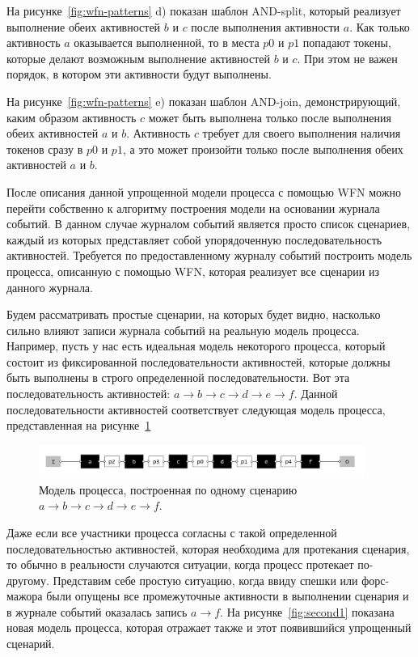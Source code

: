 \documentclass[
11pt,%
tightenlines,%
twoside,%
onecolumn,%
nofloats,%
nobibnotes,%
nofootinbib,%
superscriptaddress,%
noshowpacs,%
centertags]%
{revtex4}
\begin{document}
На рисунке~\ref{fig:wfn-patterns} d) показан шаблон AND-split, который реализует выполнение обеих активностей $b$ и $c$ после выполнения активности $a$.
Как только активность $a$ оказывается выполненной, то в места $p0$ и $p1$ попадают токены, которые делают возможным выполнение активностей $b$ и $c$.
При этом не важен порядок, в котором эти активности будут выполнены.

На рисунке~\ref{fig:wfn-patterns} e) показан шаблон AND-join, демонстрирующий, каким образом активность $c$ может быть выполнена только после выполнения обеих активностей $a$ и $b$.
Активность $c$ требует для своего выполнения наличия токенов сразу в $p0$ и $p1$, а это может произойти только после выполнения обеих активностей $a$ и $b$.

После описания данной упрощенной модели процесса с помощью WFN можно перейти собственно к алгоритму построения модели на основании журнала событий.
В данном случае журналом событий является просто список сценариев, каждый из которых представляет собой упорядоченную последовательность активностей.
Требуется по предоставленному журналу событий построить модель процесса, описанную с помощью WFN, которая реализует все сценарии из данного журнала.

Будем рассматривать простые сценарии, на которых будет видно, насколько сильно влияют записи журнала событий на реальную модель процесса.
Например, пусть у нас есть идеальная модель некоторого процесса, который состоит из фиксированной последовательности активностей, которые должны быть выполнены в строго определенной последовательности.
Вот эта последовательность активностей: $a \rightarrow b \rightarrow c \rightarrow d \rightarrow e \rightarrow f$.
Данной последовательности активностей соответствует следующая модель процесса, представленная на рисунке~\ref{fig:origin1}

\begin{figure}[h]
\setcaptionmargin{5mm}
\includegraphics[width=0.95\textwidth]{pics/origin1.png}
\caption{Модель процесса, построенная по одному сценарию $a \rightarrow b \rightarrow c \rightarrow d \rightarrow e \rightarrow f$.}
\label{fig:origin1}
\end{figure}

Даже если все участники процесса согласны с такой определенной последовательностью активностей, которая необходима для протекания сценария, то обычно в реальности случаются ситуации, когда процесс протекает по-другому.
Представим себе простую ситуацию, когда ввиду спешки или форс-мажора были опущены все промежуточные активности в выполнении сценария и в журнале событий оказалась запись $a \rightarrow f$.
На рисунке~\ref{fig:second1} показана новая модель процесса, которая отражает также и этот появившийся упрощенный сценарий.
\end{document}
